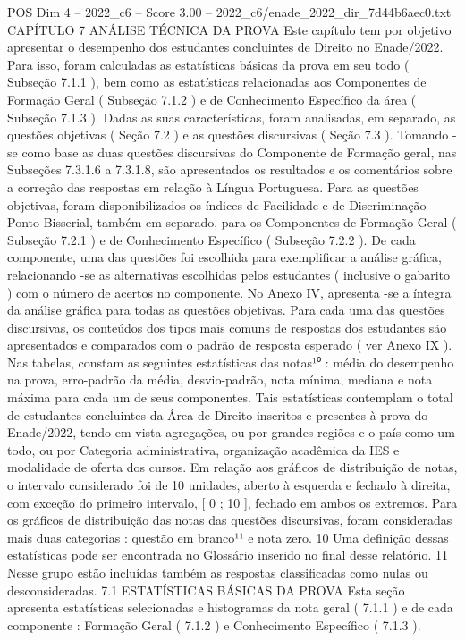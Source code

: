 \begin{textsample}{POS Dim 4 – 2022\_c6 – Score 3.00 – 2022\_c6/enade\_2022\_dir\_7d44b6aec0.txt}  \label{ex:f4_pos_089}
CAPÍTULO 7 ANÁLISE TÉCNICA DA PROVA Este capítulo tem por objetivo apresentar o desempenho dos estudantes concluintes de Direito no Enade/2022.
Para isso, foram calculadas as estatísticas básicas da prova em seu todo ( Subseção 7.1.1 ), bem como as estatísticas relacionadas aos Componentes de Formação Geral ( Subseção 7.1.2 ) e de Conhecimento Específico da área ( Subseção 7.1.3 ).
Dadas as suas características, foram analisadas, em separado, as questões objetivas ( Seção 7.2 ) e as questões discursivas ( Seção 7.3 ).
Tomando -se como base as duas questões discursivas do Componente de Formação geral, nas Subseções 7.3.1.6 a 7.3.1.8, são apresentados os resultados e os comentários sobre a correção das respostas em relação à Língua Portuguesa.
Para as questões objetivas, foram disponibilizados os índices de Facilidade e de Discriminação Ponto-Bisserial, também em separado, para os Componentes de Formação Geral ( Subseção 7.2.1 ) e de Conhecimento Específico ( Subseção 7.2.2 ).
De cada componente, uma das questões foi escolhida para exemplificar a análise gráfica, relacionando -se as alternativas escolhidas pelos estudantes ( inclusive o gabarito ) com o número de acertos no componente.
No Anexo IV, apresenta -se a íntegra da análise gráfica para todas as questões objetivas.
Para cada uma das questões discursivas, os conteúdos dos tipos mais comuns de respostas dos estudantes são apresentados e comparados com o padrão de resposta esperado ( ver Anexo IX ).
Nas tabelas, constam as seguintes estatísticas das notas¹⁰ : média do desempenho na prova, erro-padrão da média, desvio-padrão, nota mínima, mediana e nota máxima para cada um de seus componentes.
Tais estatísticas contemplam o total de estudantes concluintes da Área de Direito inscritos e presentes à prova do Enade/2022, tendo em vista agregações, ou por grandes regiões e o país como um todo, ou por Categoria administrativa, organização acadêmica da IES e modalidade de oferta dos cursos.
Em relação aos gráficos de distribuição de notas, o intervalo considerado foi de 10 unidades, aberto à esquerda e fechado à direita, com exceção do primeiro intervalo, [ 0 ; 10 ], fechado em ambos os extremos.
Para os gráficos de distribuição das notas das questões discursivas, foram consideradas mais duas categorias : questão em branco¹¹ e nota zero. 10 Uma definição dessas estatísticas pode ser encontrada no Glossário inserido no final desse relatório. 11 Nesse grupo estão incluídas também as respostas classificadas como nulas ou desconsideradas. 7.1 ESTATÍSTICAS BÁSICAS DA PROVA Esta seção apresenta estatísticas selecionadas e histogramas da nota geral ( 7.1.1 ) e de cada componente : Formação Geral ( 7.1.2 ) e Conhecimento Específico ( 7.1.3 ).

\end{textsample}
